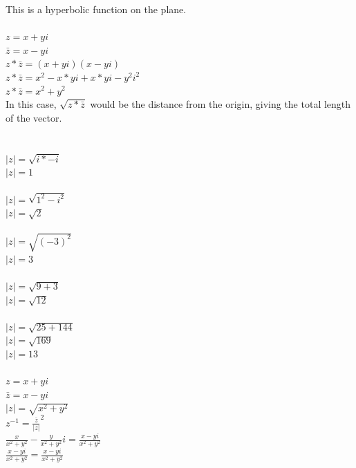 \documentclass[12pt]{article}
\begin{document}
This is a hyperbolic function on the plane.\\

\\

$z = x + yi$\\
$\bar{z} = x - yi$\\


$z*\bar{z} = (x + yi)(x - yi)$\\
$z*\bar{z} = x^2 - x*yi + x*yi - y^2i^2$\\
$z*\bar{z} = x^2 + y^2$\\

In this case, $\sqrt{z*\bar{z}}$ would be the distance from the origin, giving the total length of the vector.\\


\\

\\
$|z| = \sqrt{i*-i}$\\
$|z| = 1$\\

\\
$|z| = \sqrt{1^2 - i^2}$\\
$|z| = \sqrt{2}$\\


\\
$|z| = \sqrt{(-3)^2}$\\
$|z| = 3$\\

\\
$|z| = \sqrt{9 + 3}$\\
$|z| = \sqrt{12}$\\

\\
$|z| = \sqrt{25 + 144}$\\
$|z| = \sqrt{169}$\\
$|z| = 13$\\

\\

$z = x + yi$\\
$\bar{z} = x - yi$\\
$|z| = \sqrt{x^2 + y^2}$\\

$z^{-1} = \frac{\bar{z}}{|z|}^2$\\

$\frac{x}{x^2+y^2} - \frac{y}{x^2+y^2}i = \frac{x-yi}{x^2 + y^2}$\\
$\frac{x-yi}{x^2 + y^2} = \frac{x-yi}{x^2 + y^2}$\\
\end{document}
